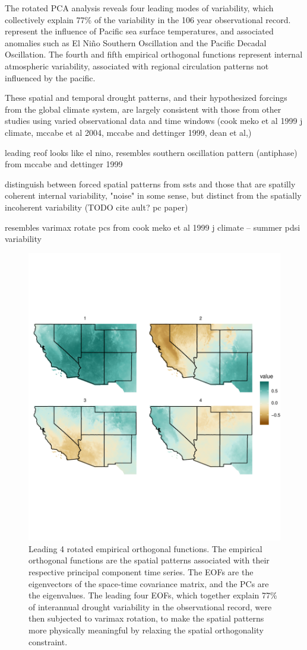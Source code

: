 \documentclass[fleqn,10pt]{wlscirep}
\begin{document}
The rotated PCA analysis reveals four leading modes of variability, which collectively explain 77\% of the variability in the 106 year observational record. represent the influence of Pacific sea surface temperatures, and associated anomalies such as El Ni\~no Southern Oscillation and the Pacific Decadal Oscillation. The fourth and fifth empirical orthogonal functions represent internal atmospheric variability, associated with regional circulation patterns not influenced by the pacific.

These spatial and temporal drought patterns, and their hypothesized forcings from the global climate system, are largely consistent with those from other studies using varied observational data and time windows (cook meko et al 1999 j climate, mccabe et al 2004, mccabe and dettinger 1999, dean et al,)

leading reof looks like el nino, resembles southern oscillation pattern (antiphase) from mccabe and dettinger 1999

distinguish between forced spatial patterns from ssts and those that are spatilly coherent internal variability, "noise" in some sense, but distinct from the spatially incoherent variability (TODO cite ault? pc paper)


resembles varimax rotate pcs from cook meko et al 1999 j climate -- summer pdsi variability

\begin{figure}[ht]
\centering
\includegraphics[width=.8\linewidth]{figures/eof_observed.pdf}
\caption{Leading 4 rotated empirical orthogonal functions. The empirical orthogonal functions are the spatial patterns associated with their respective principal component time series. The EOFs are the eigenvectors of the space-time covariance matrix, and the PCs are the eigenvalues. The leading four EOFs, which together explain 77\% of interannual drought variability in the observational record, were then subjected to varimax rotation, to make the spatial patterns more physically meaningful by relaxing the spatial orthogonality constraint.}
\label{fig:reofs}
\end{figure}
\end{document}
